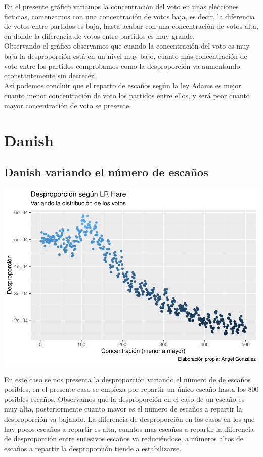 \documentclass[12pt,a4paper,]{book}
\numberwithin{dummy}{section}
\theoremstyle{ocrenumbox}
\theoremstyle{blacknumex}
\theoremstyle{blacknumbox}
\theoremstyle{ocrenum}
\theoremstyle{ocrenum}
\begin{document}
En el presente gráfico variamos la concentración del voto en unas
elecciones ficticias, comenzamos con una concentración de votos baja, es
decir, la diferencia de votos entre partidos es baja, hasta acabar con
una concentración de votos alta, en donde la diferencia de votos entre
partidos es muy grande.\\
Observando el gráfico observamos que cuando la concentración del voto es
muy baja la desproporción está en un nivel muy bajo, cuanto más
concentración de voto entre los partidos comprobamos como la
desproporción va aumentando cconstantemente sin decrecer.\\
Así podemos concluir que el reparto de escaños según la ley Adams es
mejor cuanto menor concentración de voto los partidos entre ellos, y
será peor cuanto mayor concentración de voto se presente.

\hypertarget{danish}{%
\section{Danish}\label{danish}}

\hypertarget{danish-variando-el-nuxfamero-de-escauxf1os}{%
\subsection{Danish variando el número de
escaños}\label{danish-variando-el-nuxfamero-de-escauxf1os}}

\begin{center}\includegraphics[width=0.95\linewidth]{figurasR/unnamed-chunk-43-1} \end{center}

En este caso se nos presenta la desproporción variando el número de de
escaños posibles, en el presente caso se empieza por repartir un único
escaño hasta los 800 posibles escaños. Observamos que la desproporción
en el caso de un escaño es muy alta, posteriormente cuanto mayor es el
número de escaños a repartir la desproporción va bajando. La diferencia
de desproporción en los casos en los que hay pocos escaños a repartir es
alta, cuantos mas escaños a repartir la diferencia de desproporción
entre sucesivos escaños va reduciéndose, a números altos de escaños a
repartir la desproporción tiende a estabilizarse.
\end{document}

